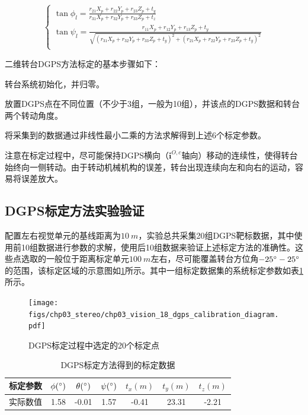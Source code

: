 \begin{equation}
\left\{ \begin{gathered}
\tan \phi_l= \frac{r_{21}X_p + r_{22}Y_p + r_{23}Z_p + t_y}{r_{31}X_p + r_{32}Y_p + r_{33}Z_p + t_z} \\
\tan \psi_l= \frac{r_{11}X_p + r_{12}Y_p + r_{13}Z_p + t_y}{\sqrt{(r_{31}X_p + r_{32}Y_p + r_{33}Z_p + t_y)^2+(r_{21}X_p + r_{22}Y_p + r_{23}Z_p + t_y)^2} }\\
\end{gathered}  \right.
\end{equation}

二维转台DGPS方法标定的基本步骤如下：
\begin{compactenum}
	\item
	转台系统初始化，并归零。
	\item
	放置DGPS点在不同位置（不少于3组，一般为10组），并该点的DGPS数据和转台两个转动角度。
	\item
	将采集到的数据通过非线性最小二乘的方法求解得到上述6个标定参数。
\end{compactenum}
注意在标定过程中，尽可能保持DGPS横向（$\mathbf{i}^{O,c}$轴向）移动的连续性，使得转台始终向一侧转动。由于转动机械机构的误差，转台出现连续向左和向右的运动，容易将误差放大。

\subsection{DGPS标定方法实验验证}
配置左右视觉单元的基线距离为$10\ m$，实验总共采集20组DGPS靶标数据，其中使用前10组数据进行参数的求解，使用后10组数据来验证上述标定方法的准确性。这些点选取的一般位于距离标定单元$100\ m$左右，尽可能覆盖转台方位角$-25\degree-25\degree$的范围，该标定区域的示意图如\ref{fig:chp03_vision_18_dgps_calibration_diagram}所示。其中一组标定数据集的系统标定参数如表\ref{label:dgps_calibration}所示。

\begin{figure}[htb]
	\centering
	\texttt{[image: figs/chp03\_stereo/chp03\_vision\_18\_dgps\_calibration\_diagram.pdf]}	
	\caption{DGPS标定过程中选定的20个标定点}
	\label{fig:chp03_vision_18_dgps_calibration_diagram}
\end{figure}

\begin{table}[htb]
	\centering
	\caption{DGPS标定方法得到的标定数据}
	\label{label:dgps_calibration}
	\begin{tabular}{ccccccc}
		\hline
		标定参数 & $\phi (\degree)$ & $\theta (\degree)$ & $\psi (\degree)$ & $t_x (m)$ & $t_y(m)$ & $t_z(m)$ \\ \hline
		实际数值 & 1.58             & -0.01              & 1.57             & -0.41     & 23.31   & -2.21    \\ \hline
	\end{tabular}
\end{table}

